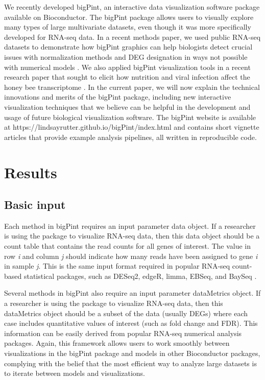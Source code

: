 \documentclass[parskip=full]{bmcart} %
\begin{document}
We recently developed bigPint, an interactive data visualization software package available on Bioconductor. The bigPint package allows users to visually explore many types of large multivariate datasets, even though it was more specifically developed for RNA-seq data. In a recent methods paper, we used public RNA-seq datasets to demonstrate how bigPint graphics can help biologists detect crucial issues with normalization methods and DEG designation in ways not possible with numerical models \cite{rutter1}. We also applied bigPint visualization tools in a recent research paper that sought to elicit how nutrition and viral infection affect the honey bee transcriptome \cite{rutter2}. In the current paper, we will now explain the technical innovations and merits of the bigPint package, including new interactive visualization techniques that we believe can be helpful in the development and usage of future biological visualization software. The bigPint website is available at https://lindsayrutter.github.io/bigPint/index.html and contains short vignette articles that provide example analysis pipelines, all written in reproducible code.

\section*{Results}

\subsection*{Basic input}

Each method in bigPint requires an input parameter data object. If a researcher is using the package to visualize RNA-seq data, then this data object should be a count table that contains the read counts for all genes of interest. The value in row \textit{i} and column \textit{j} should indicate how many reads have been assigned to gene \textit{i} in sample \textit{j}. This is the same input format required in popular RNA-seq count-based statistical packages, such as DESeq2, edgeR, limma, EBSeq, and BaySeq \cite{deseq2, edger, limma, ebseq, bayseq}. 

Several methods in bigPint also require an input parameter dataMetrics object. If a researcher is using the package to visualize RNA-seq data, then this dataMetrics object should be a subset of the data (usually DEGs) where each case includes quantitative values of interest (such as fold change and FDR). This information can be easily derived from popular RNA-seq numerical analysis packages. Again, this framework allows users to work smoothly between visualizations in the bigPint package and models in other Bioconductor packages, complying with the belief that the most efficient way to analyze large datasets is to iterate between models and visualizations.
\end{document}
